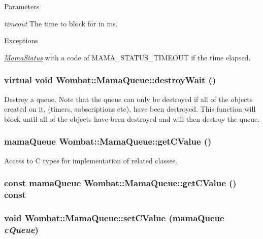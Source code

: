 \begin{DoxyParams}{Parameters}
\item[{\em timeout}]The time to block for in ms. \end{DoxyParams}

\begin{DoxyExceptions}{Exceptions}
\item[{\em \hyperlink{classWombat_1_1MamaStatus}{MamaStatus}}]with a code of MAMA\_\-STATUS\_\-TIMEOUT if the time elapsed. \end{DoxyExceptions}
\hypertarget{classWombat_1_1MamaQueue_a2e34e08c5fcf44cf3b347071c1501ec5}{
\subsubsection[{destroyWait}]{\setlength{\rightskip}{0pt plus 5cm}virtual void Wombat::MamaQueue::destroyWait ()}}
\label{classWombat_1_1MamaQueue_a2e34e08c5fcf44cf3b347071c1501ec5}


Destroy a queue. Note that the queue can only be destroyed if all of the objects created on it, (timers, subscriptions etc), have been destroyed. This function will block until all of the objects have been destroyed and will then destroy the queue. \hypertarget{classWombat_1_1MamaQueue_a574267c7489b3e4db622befb1f07fcc4}{
\subsubsection[{getCValue}]{\setlength{\rightskip}{0pt plus 5cm}mamaQueue Wombat::MamaQueue::getCValue ()}}
\label{classWombat_1_1MamaQueue_a574267c7489b3e4db622befb1f07fcc4}


Access to C types for implementation of related classes. \hypertarget{classWombat_1_1MamaQueue_a54a801b112d64a8c8d4a56727a9e799a}{
\subsubsection[{getCValue}]{\setlength{\rightskip}{0pt plus 5cm}const mamaQueue Wombat::MamaQueue::getCValue () const}}
\label{classWombat_1_1MamaQueue_a54a801b112d64a8c8d4a56727a9e799a}
\hypertarget{classWombat_1_1MamaQueue_ab43f6f93c109d66a287f1d45e6a8b284}{
\subsubsection[{setCValue}]{\setlength{\rightskip}{0pt plus 5cm}void Wombat::MamaQueue::setCValue (mamaQueue {\em cQueue})}}
\label{classWombat_1_1MamaQueue_ab43f6f93c109d66a287f1d45e6a8b284}


